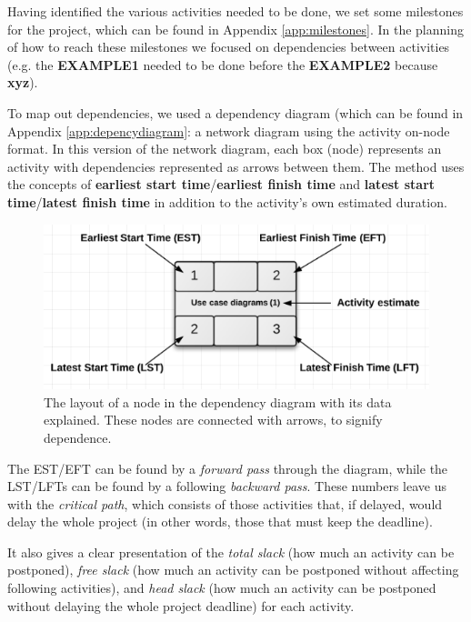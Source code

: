 Having identified the various activities needed to be done, we set some milestones for the project, which can be found in Appendix \ref{app:milestones}.
In the planning of how to reach these milestones we focused on dependencies
between activities (e.g. the \textbf{EXAMPLE1} needed to be done before the
\textbf{EXAMPLE2} because \textbf{xyz}).

To map out dependencies, we used a dependency diagram (which can be found in Appendix
\ref{app:depencydiagram}: a network diagram using the activity on-node format\cite{caye}.
In this version of the network diagram, each box (node) represents an activity with
dependencies represented as arrows between them. The method uses the concepts of
\textbf{earliest start time}/\textbf{earliest finish time} and \textbf{latest start
time}/\textbf{latest finish time} in addition to the activity’s own estimated duration.

\begin{figure}[hbtp]
    \includegraphics[scale=0.5]{./Empiri/Planning/img/networkdiagramnotation.png}
    \caption{The layout of a node in the dependency diagram with its data explained. These nodes are connected with arrows, to signify dependence.}
\end{figure}
 
The EST/EFT can be found by a \emph{forward pass} through the diagram, while the LST/LFTs
can be found by a following \emph{backward pass}. These numbers leave us with the
\emph{critical path}, which consists of those activities that, if delayed, would delay
the whole project (in other words, those that must keep the deadline).

It also gives a clear presentation of the \emph{total slack} (how much an activity can
be postponed), \emph{free slack} (how much an activity can be postponed without affecting
following activities), and \emph{head slack} (how much an activity can be postponed without
delaying the whole project deadline) for each activity.